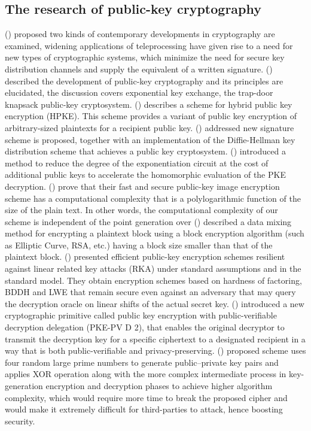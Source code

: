 \documentclass[graybox]{svmult}
\begin{document}
\subsection{The research of public-key cryptography}
\citeauthor{diffie1976} (\citeyear{diffie1976}) proposed two kinds of contemporary developments in cryptography are examined, widening applications of teleprocessing have given rise to a need for new types of cryptographic systems, which minimize the need for secure key distribution channels and supply the equivalent of a written signature.
\citeauthor{diffie1988} (\citeyear{diffie1988}) described the development of public-key cryptography and its  principles are elucidated, the discussion covers exponential key exchange, the trap-door knapsack public-key cryptosystem.
\citeauthor{barnes2022} (\citeyear{barnes2022}) describes a scheme for  hybrid public key encryption (HPKE). This scheme provides a variant of public key encryption of arbitrary-sized plaintexts for a recipient public key.
\citeauthor{elgamal1985} (\citeyear{elgamal1985}) addressed new signature scheme is proposed, together with an  implementation of the Diffie-Hellman key distribution scheme that achieves a public key cryptosystem.
\citeauthor{cheon2015} (\citeyear{cheon2015}) introduced a method to reduce the degree of the exponentiation circuit at the cost of additional public keys to accelerate the homomorphic evaluation of the PKE decryption.
\citeauthor{azam2021} (\citeyear{azam2021}) prove that their fast and secure public-key image encryption scheme has a computational complexity that is a polylogarithmic function of the size of the plain text.
In other words, the computational complexity of our scheme is independent of the point generation over
\citeauthor{zhang2021} (\citeyear{zhang2021}) described a data mixing method for encrypting a plaintext block using a block encryption algorithm (such as Elliptic Curve, RSA, etc.) having a block size smaller than that of the plaintext block.
\citeauthor{wee2012} (\citeyear{wee2012}) presented efficient public-key encryption schemes resilient against linear related key attacks (RKA) under standard assumptions and in the standard model. They obtain encryption schemes based on hardness of factoring, BDDH and LWE that remain secure even against an adversary that may query the decryption oracle on linear shifts of the actual secret key.
\citeauthor{hou2023} (\citeyear{hou2023}) introduced a new cryptographic primitive called public key encryption with public-verifiable decryption delegation (PKE-PV D 2), that enables the original decryptor to transmit the decryption key for a specific ciphertext to a designated recipient in a way that is both public-verifiable and privacy-preserving.
\citeauthor{imam2022} (\citeyear{imam2022}) proposed scheme uses four random large prime numbers to generate public–private key pairs and applies XOR operation along with the more complex intermediate process in key-generation encryption and decryption phases to achieve higher algorithm complexity, which would require more time to break the proposed cipher and would make it extremely difficult for third-parties to attack, hence boosting security.
\end{document}
